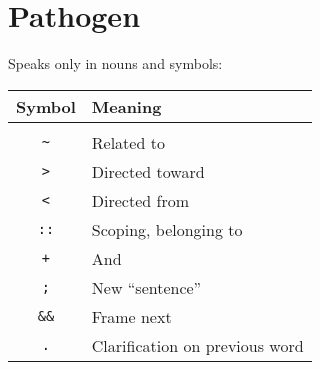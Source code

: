 \section{Pathogen}

Speaks only in nouns and symbols:

\begin{tabular}{|c|l|}
  \hline
  Symbol & Meaning \\
  \hline & \\
  \verb!~! & Related to \\
  \verb!>! & Directed toward \\
  \verb!<! & Directed from \\
  \verb!::! & Scoping, belonging to \\
  \verb!+! & And \\
  \verb!;! & New ``sentence'' \\
  \verb!&&! & Frame next \\
  \verb!.! & Clarification on previous word \\
  \hline
\end{tabular}

